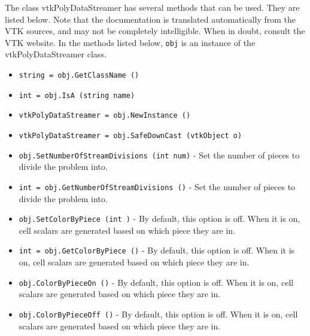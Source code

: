 The class vtkPolyDataStreamer has several methods that can be used.
  They are listed below.
Note that the documentation is translated automatically from the VTK sources,
and may not be completely intelligible.  When in doubt, consult the VTK website.
In the methods listed below, \verb|obj| is an instance of the vtkPolyDataStreamer class.
\begin{itemize}
\item  \verb|string = obj.GetClassName ()|

\item  \verb|int = obj.IsA (string name)|

\item  \verb|vtkPolyDataStreamer = obj.NewInstance ()|

\item  \verb|vtkPolyDataStreamer = obj.SafeDownCast (vtkObject o)|

\item  \verb|obj.SetNumberOfStreamDivisions (int num)| -  Set the number of pieces to divide the problem into.

\item  \verb|int = obj.GetNumberOfStreamDivisions ()| -  Set the number of pieces to divide the problem into.

\item  \verb|obj.SetColorByPiece (int )| -  By default, this option is off.  When it is on, cell scalars are generated
 based on which piece they are in.

\item  \verb|int = obj.GetColorByPiece ()| -  By default, this option is off.  When it is on, cell scalars are generated
 based on which piece they are in.

\item  \verb|obj.ColorByPieceOn ()| -  By default, this option is off.  When it is on, cell scalars are generated
 based on which piece they are in.

\item  \verb|obj.ColorByPieceOff ()| -  By default, this option is off.  When it is on, cell scalars are generated
 based on which piece they are in.

\end{itemize}
